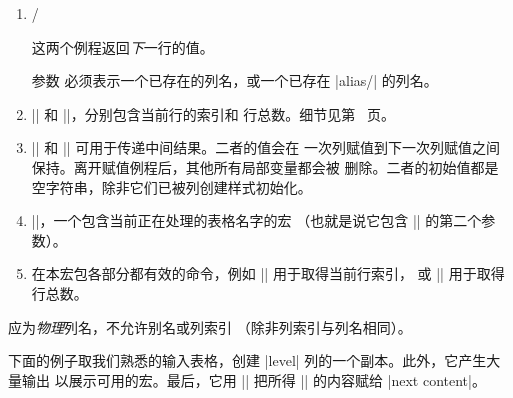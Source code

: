 \documentclass[a4paper,doc2]{ltxdoc}
\begin{document}
\begin{command}{\pgfplotstablecreatecol{}}
\begin{enumerate}
            这两个例程返回存储在指定列中的\emph{当前}行的值。|get| 例程把它存入
            。

            参数  必须表示一个已存在的列名，或一个已存在
            |alias/| 的列名。
        \item \declareandlabel{\nextrow} /
            \declareandlabel{\getnextrow}

            这两个例程返回\emph{下}一行的值。

            参数  必须表示一个已存在的列名，或一个已存在
            |alias/| 的列名。
        \item |\pgfplotstablerow| 和 |\pgfplotstablerows|，分别包含当前行的索引和
            行总数。细节见第~\pageref{pgfplotstable:page:tablerow} 页。
        \item |\pgfmathaccuma| 和 |\pgfmathaccumb| 可用于传递中间结果。二者的值会在
            一次列赋值到下一次列赋值之间保持。离开赋值例程后，其他所有局部变量都会被
            删除。二者的初始值都是空字符串，除非它们已被列创建样式初始化。
        \item |\pgfplotstablename|，一个包含当前正在处理的表格名字的宏
            （也就是说它包含 |\pgfplotstablecreatecol| 的第二个参数）。
        \item 在本宏包各部分都有效的命令，例如 |\pgfplotstablerow| 用于取得当前行索引，
            或 |\pgfplotstablerows| 用于取得行总数。
    \end{enumerate}
     应为\emph{物理}列名，不允许别名或列索引
    （除非列索引与列名相同）。

    下面的例子取我们熟悉的输入表格，创建 |level| 列的一个副本。此外，它产生大量输出
    以展示可用的宏。最后，它用 |\pgfkeyslet| 把所得 |\entry| 的内容赋给
    |next content|。
\begin{codeexample}[]
\loadedtable
{}\loadedtable

\pgfplotstabletypeset[
    column type=l,
    columns={level,new},
    columns/new/.style={string type}
]\loadedtable
\end{codeexample}


\end{command}
\end{document}
